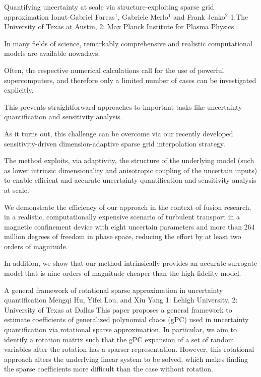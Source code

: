 \begin{addmargin}[2em]{0em}
\vspace{1.5ex}
\abs
{Quantifying uncertainty at scale via structure-exploiting sparse grid approximation}
{Ionut-Gabriel Farcas$^{1}$, Gabriele Merlo$^{1}$ and Frank Jenko$^{2}$}
{1:The University of Texas at Austin, 2: Max Planck Institute for Plasma Physics}
{In many fields of science, remarkably comprehensive and realistic computational models are available nowadays.

Often, the respective numerical calculations call for the use of powerful supercomputers, and therefore only a limited number of cases can be investigated explicitly.

This prevents straightforward approaches to important tasks like uncertainty quantification and sensitivity analysis.

As it turns out, this challenge can be overcome via our recently developed sensitivity-driven dimension-adaptive sparse grid interpolation strategy.

The method exploits, via adaptivity, the structure of the underlying model (such as lower intrinsic dimensionality and anisotropic coupling of the uncertain inputs) to enable efficient and accurate uncertainty quantification and sensitivity analysis at scale.

We demonstrate the efficiency of our approach in the context of fusion research, in a realistic, computationally expensive scenario of turbulent transport in a magnetic confinement device with eight uncertain parameters and more than 264 million degrees of freedom in phase space, reducing the effort by at least two orders of magnitude.

In addition, we show that our method intrinsically provides an accurate surrogate model that is nine orders of magnitude cheaper than the high-fidelity model.}


\vspace{1.5ex}
\abs
{A general framework of rotational sparse approximation in uncertainty quantification}
{Mengqi Hu, Yifei Lou, and Xiu Yang}
{1: Lehigh University, 2: University of Texas at Dallas}
{This paper proposes a general framework to estimate coefficients of generalized  polynomial chaos (gPC) used in uncertainty quantification via rotational sparse approximation. In particular, we aim to identify a rotation matrix such that the gPC expansion of a set of random variables after the rotation has a sparser representation. However, this rotational approach alters the underlying linear system to be solved, which makes finding the sparse coefficients more difficult than the case without rotation.}



\end{addmargin}
